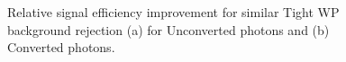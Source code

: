 \begin{figure}[htbp]
    \centering
	\begin{tcolorbox}[colback=black!5!white,colframe=white!75!black]
    \caption{Relative signal efficiency improvement for similar Tight WP background rejection (a) for Unconverted photons and (b) Converted photons.}
    \label{fig:gamma:CNN:Validation:Imp}
    \end{tcolorbox}
    
\end{figure}


